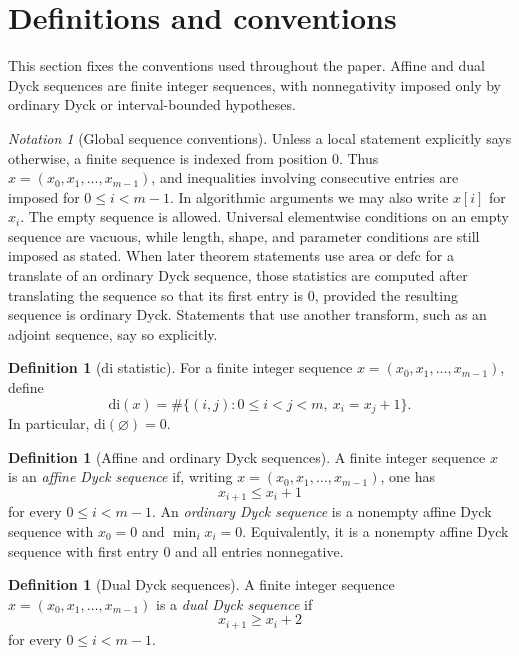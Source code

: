 \documentclass[11pt]{article}
\theoremstyle{plain}
\theoremstyle{definition}
\newtheorem{definition}[theorem]{Definition}
\theoremstyle{remark}
\newtheorem*{notation}{Notation}
\newcommand{\di}{\mathrm{di}}
\newcommand{\area}{\mathrm{area}}
\newcommand{\defc}{\mathrm{defc}}
\begin{document}
\section{Definitions and conventions}
\label{sec:definitions}
This section fixes the conventions used throughout the paper.  Affine and dual
Dyck sequences are finite integer sequences, with nonnegativity imposed only by
ordinary Dyck or interval-bounded hypotheses.
\begin{notation}[Global sequence conventions]
Unless a local statement explicitly says otherwise, a finite sequence is
indexed from position \(0\).  Thus
\(x=(x_0,x_1,\ldots,x_{m-1})\), and inequalities involving consecutive entries
are imposed for \(0\le i<m-1\).  In algorithmic arguments we may also write
\(x[i]\) for \(x_i\).  The empty sequence is allowed.  Universal elementwise
conditions on an empty sequence are vacuous, while length, shape, and parameter
conditions are still imposed as stated.
When later theorem statements use \(\area\) or \(\defc\) for a translate of an
ordinary Dyck sequence, those statistics are computed after translating the
sequence so that its first entry is \(0\), provided the resulting sequence is
ordinary Dyck.  Statements that use another transform, such as an adjoint
sequence, say so explicitly.
\end{notation}
\begin{definition}[\(\di\) statistic]
\label{def:di}
For a finite integer sequence \(x=(x_0,x_1,\ldots,x_{m-1})\), define
\[
\di(x)=\#\bigl\{(i,j):0\le i<j<m,\ x_i=x_j+1\bigr\}.
\]
In particular, \(\di(\varnothing)=0\).
\end{definition}
\begin{definition}[Affine and ordinary Dyck sequences]
\label{def:affine-dyck}
A finite integer sequence \(x\) is an \emph{affine Dyck sequence} if, writing
\(x=(x_0,x_1,\ldots,x_{m-1})\), one has
\[
x_{i+1}\le x_i+1
\]
for every \(0\le i<m-1\).
An \emph{ordinary Dyck sequence} is a nonempty affine Dyck sequence with
\(x_0=0\) and \(\min_i x_i=0\).  Equivalently, it is a nonempty affine Dyck
sequence with first entry \(0\) and all entries nonnegative.
\end{definition}
\begin{definition}[Dual Dyck sequences]
\label{def:dual-dyck}
A finite integer sequence \(x=(x_0,x_1,\ldots,x_{m-1})\) is a
\emph{dual Dyck sequence} if
\[
x_{i+1}\ge x_i+2
\]
for every \(0\le i<m-1\).
\end{definition}
\end{document}
